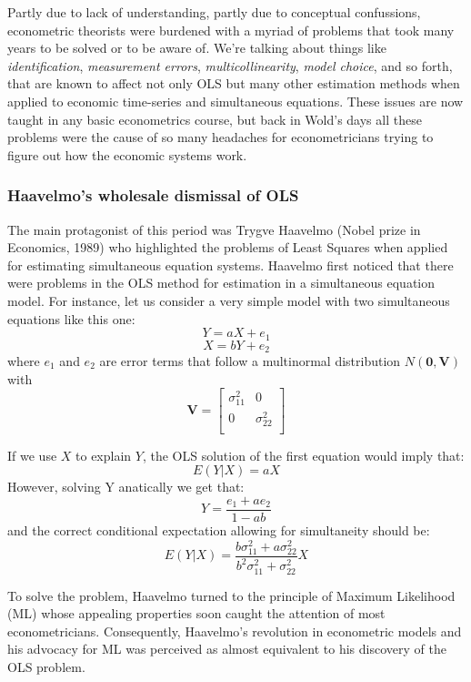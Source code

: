 \documentclass[12pt]{book}\usepackage{graphicx, color}
\begin{document}
Partly due to lack of understanding, partly due to conceptual confussions, econometric theorists were burdened with a myriad of problems that took many years to be solved or to be aware of. We're talking about things like \textit{identification}, \textit{measurement errors}, \textit{multicollinearity}, \textit{model choice}, and so forth, that are known to affect not only OLS but many other estimation methods when applied to economic time-series and simultaneous equations. These issues are now taught in any basic econometrics course, but back in Wold's days all these problems were the cause of so many headaches for econometricians trying to figure out how the economic systems work.


\subsubsection*{Haavelmo's wholesale dismissal of OLS}
The main protagonist of this period was Trygve Haavelmo (Nobel prize in Economics, 1989) who highlighted the problems of Least Squares when applied for estimating simultaneous equation systems.  Haavelmo first noticed that there were problems in the OLS method for estimation in a simultaneous equation model. For instance, let us consider a very simple model with two simultaneous equations like this one:
$$ Y = aX + e_1 $$
$$ X = bY + e_2 $$
where $e_1$ and $e_2$ are error terms that follow a multinormal distribution $N(\textbf{0}, \textbf{V})$ with
\[
 \textbf{V} = \begin{bmatrix}
       \sigma_{11}^2 & 0 \\
       0 & \sigma_{22}^2 \\
     \end{bmatrix}
\]

If we use $X$ to explain $Y$, the OLS solution of the first equation would imply that:
$$ E(Y | X) = aX $$
However, solving Y anatically we get that:
$$ Y = \frac{e_1 + a e_2}{1 - ab} $$
and the correct conditional expectation allowing for simultaneity should be:
$$ E(Y | X) = \frac{b \sigma_{11}^2 + a \sigma_{22}^2}{b^2 \sigma_{11}^2 + \sigma_{22}^2} X $$

To solve the problem, Haavelmo turned to the principle of Maximum Likelihood (ML) whose appealing properties soon caught the attention of most econometricians. Consequently, Haavelmo's revolution in econometric models and his advocacy for ML was perceived as almost equivalent to his discovery of the OLS problem. 
\end{document}
